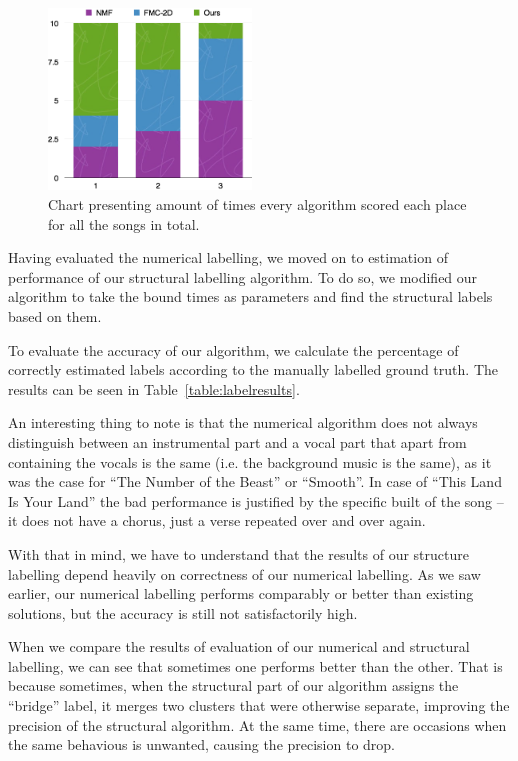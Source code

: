 \begin{figure}
\vspace{-30pt}
  \begin{center}
    \includegraphics[width=0.48\textwidth]{Figures/labellingdistribution}
  \end{center}
  \caption{Chart presenting amount of times every algorithm scored each place for all the songs in total.}
\label{fig:labelrank}
\end{figure}

Having evaluated the numerical labelling, we moved on to estimation of performance of our structural labelling algorithm. To do so, we modified our algorithm to take the bound times as parameters and find the structural labels based on them. 

To evaluate the accuracy of our algorithm, we calculate the percentage of correctly estimated labels according to the manually labelled ground truth. The results can be seen in Table~\ref{table:labelresults}. 

An interesting thing to note is that the numerical algorithm does not always distinguish between an instrumental part and a vocal part that apart from containing the vocals is the same (i.e. the background music is the same), as it was the case for ``The Number of the Beast'' or ``Smooth''. In case of ``This Land Is Your Land'' the bad performance is justified by the specific built of the song -- it does not have a chorus, just a verse repeated over and over again. 

With that in mind, we have to understand that the results of our structure labelling depend heavily on correctness of our numerical labelling. As we saw earlier, our numerical labelling performs comparably or better than existing solutions, but the accuracy is still not satisfactorily high.

When we compare the results of evaluation of our numerical and structural labelling, we can see that sometimes one performs better than the other. That is because sometimes, when the structural part of our algorithm assigns the ``bridge'' label, it merges two clusters that were otherwise separate, improving the precision of the structural algorithm. At the same time, there are occasions when the same behavious is unwanted, causing the precision to drop. 


